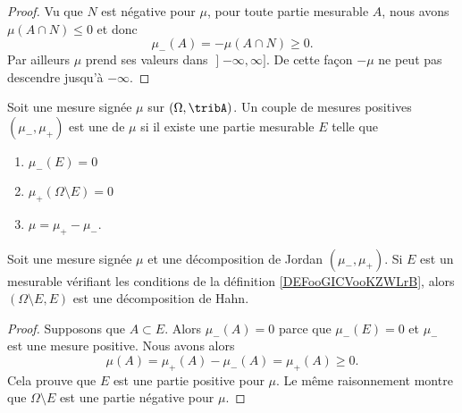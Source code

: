 \begin{proof}
	Vu que \( N\) est négative pour \( \mu\), pour toute partie mesurable \( A\), nous avons \( \mu(A\cap N)\leq 0\) et donc
	\begin{equation}
		\mu_-(A)=-\mu(A\cap N)\geq 0.
	\end{equation}
	Par ailleurs \( \mu\) prend ses valeurs dans \( \mathopen] -\infty,\infty\mathclose]\). De cette façon \( -\mu\) ne peut pas descendre jusqu'à \( -\infty\).
\end{proof}

\begin{definition}		\label{DEFooGICVooKZWLrB}
	Soit une mesure signée \( \mu\) sur \( (\Omega,\tribA)\). Un couple de mesures positives \( (\mu_-,\mu_+)\) est une  de \( \mu\) si il existe une partie mesurable \( E\) telle que
	\begin{enumerate}
		\item
		      \( \mu_-(E)=0\)
		\item
		      \( \mu_+(\Omega\setminus E)=0\)
		\item
		      \( \mu=\mu_+-\mu_-\).
	\end{enumerate}
\end{definition}

\begin{lemma}		\label{LEMooTVFRooAPdbuP}
	Soit une mesure signée \( \mu\) et une décomposition de Jordan \( (\mu_-,\mu_+)\). Si \( E\) est un mesurable vérifiant les conditions de la définition \ref{DEFooGICVooKZWLrB}, alors \( (\Omega\setminus E, E)\) est une décomposition de Hahn.
\end{lemma}

\begin{proof}
	Supposons que \( A\subset E\). Alors \( \mu_-(A)=0\) parce que \( \mu_-(E)=0\) et \( \mu_-\) est une mesure positive. Nous avons alors
	\begin{equation}
		\mu(A)=\mu_+(A)-\mu_-(A)=\mu_+(A)\geq 0.
	\end{equation}
	Cela prouve que \( E\) est une partie positive pour \( \mu\). Le même raisonnement montre que \( \Omega\setminus E\) est une partie négative pour \( \mu\).
\end{proof}

